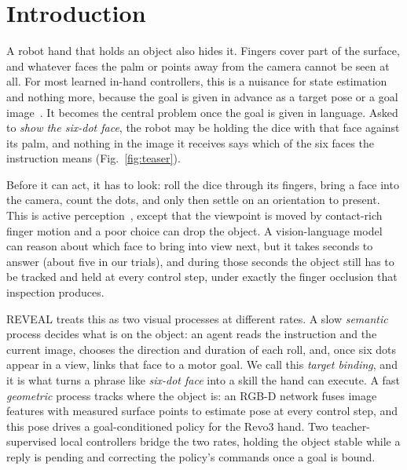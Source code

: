 \section{Introduction}
A robot hand that holds an object also hides it. Fingers cover part of the surface, and whatever faces the palm or points away from the camera cannot be seen at all. For most learned in-hand controllers, this is a nuisance for state estimation and nothing more, because the goal is given in advance as a target pose or a goal image~\cite{bhardwaj2026viserdex,bhardwaj2026goaldex,kedia2026simtoolreal}. It becomes the central problem once the goal is given in language. Asked to \emph{show the six-dot face}, the robot may be holding the dice with that face against its palm, and nothing in the image it receives says which of the six faces the instruction means (Fig.~\ref{fig:teaser}).

Before it can act, it has to look: roll the dice through its fingers, bring a face into the camera, count the dots, and only then settle on an orientation to present. This is active perception~\cite{bajcsy1988active,bohg2017interactive}, except that the viewpoint is moved by contact-rich finger motion and a poor choice can drop the object. A vision-language model can reason about which face to bring into view next, but it takes seconds to answer (about five in our trials), and during those seconds the object still has to be tracked and held at every control step, under exactly the finger occlusion that inspection produces.

REVEAL treats this as two visual processes at different rates. A slow \emph{semantic} process decides what is on the object: an agent reads the instruction and the current image, chooses the direction and duration of each roll, and, once six dots appear in a view, links that face to a motor goal. We call this \emph{target binding}, and it is what turns a phrase like \emph{six-dot face} into a skill the hand can execute. A fast \emph{geometric} process tracks where the object is: an RGB-D network fuses image features with measured surface points to estimate pose at every control step, and this pose drives a goal-conditioned policy for the Revo3 hand. Two teacher-supervised local controllers bridge the two rates, holding the object stable while a reply is pending and correcting the policy's commands once a goal is bound.

